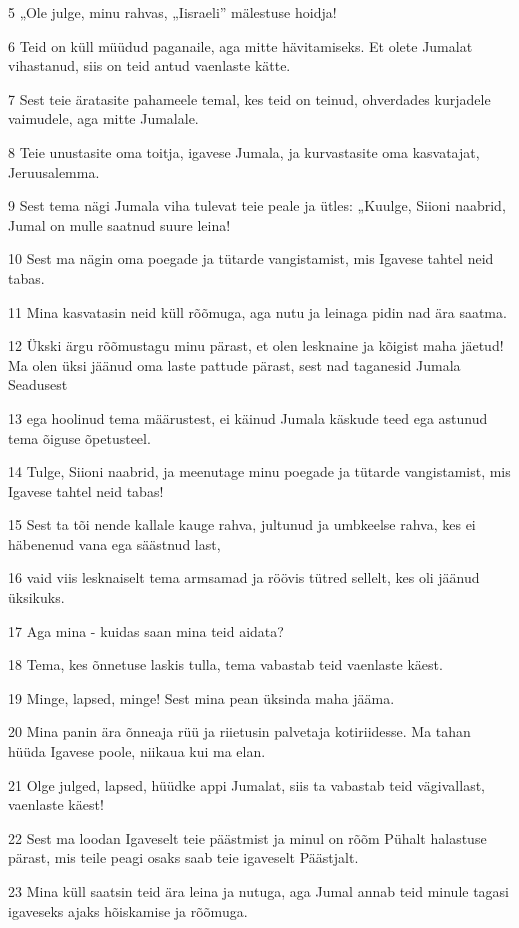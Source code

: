 \par 5 „Ole julge, minu rahvas, „Iisraeli” mälestuse hoidja!
\par 6 Teid on küll müüdud paganaile, aga mitte hävitamiseks. Et olete Jumalat vihastanud, siis on teid antud vaenlaste kätte.
\par 7 Sest teie äratasite pahameele temal, kes teid on teinud, ohverdades kurjadele vaimudele, aga mitte Jumalale.
\par 8 Teie unustasite oma toitja, igavese Jumala, ja kurvastasite oma kasvatajat, Jeruusalemma.
\par 9 Sest tema nägi Jumala viha tulevat teie peale ja ütles: „Kuulge, Siioni naabrid, Jumal on mulle saatnud suure leina!
\par 10 Sest ma nägin oma poegade ja tütarde vangistamist, mis Igavese tahtel neid tabas.
\par 11 Mina kasvatasin neid küll rõõmuga, aga nutu ja leinaga pidin nad ära saatma.
\par 12 Ükski ärgu rõõmustagu minu pärast, et olen lesknaine ja kõigist maha jäetud! Ma olen üksi jäänud oma laste pattude pärast, sest nad taganesid Jumala Seadusest
\par 13 ega hoolinud tema määrustest, ei käinud Jumala käskude teed ega astunud tema õiguse õpetusteel.
\par 14 Tulge, Siioni naabrid, ja meenutage minu poegade ja tütarde vangistamist, mis Igavese tahtel neid tabas!
\par 15 Sest ta tõi nende kallale kauge rahva, jultunud ja umbkeelse rahva, kes ei häbenenud vana ega säästnud last,
\par 16 vaid viis lesknaiselt tema armsamad ja röövis tütred sellelt, kes oli jäänud üksikuks.
\par 17 Aga mina - kuidas saan mina teid aidata?
\par 18 Tema, kes õnnetuse laskis tulla, tema vabastab teid vaenlaste käest.
\par 19 Minge, lapsed, minge! Sest mina pean üksinda maha jääma.
\par 20 Mina panin ära õnneaja rüü ja riietusin palvetaja kotiriidesse. Ma tahan hüüda Igavese poole, niikaua kui ma elan.
\par 21 Olge julged, lapsed, hüüdke appi Jumalat, siis ta vabastab teid vägivallast, vaenlaste käest!
\par 22 Sest ma loodan Igaveselt teie päästmist ja minul on rõõm Pühalt halastuse pärast, mis teile peagi osaks saab teie igaveselt Päästjalt.
\par 23 Mina küll saatsin teid ära leina ja nutuga, aga Jumal annab teid minule tagasi igaveseks ajaks hõiskamise ja rõõmuga.
